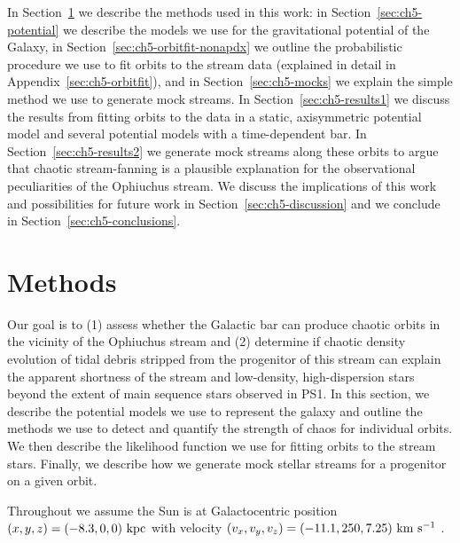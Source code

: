 In Section~\ref{sec:ch5-method} we describe the methods used in this work: in
Section~\ref{sec:ch5-potential} we describe the models we use for the gravitational
potential of the Galaxy, in Section~\ref{sec:ch5-orbitfit-nonapdx} we outline the
probabilistic procedure we use to fit orbits to the stream data (explained in
detail in Appendix~\ref{sec:ch5-orbitfit}), and in Section~\ref{sec:ch5-mocks} we
explain the simple method we use to generate mock streams. In
Section~\ref{sec:ch5-results1} we discuss the results from fitting orbits to the
data in a static, axisymmetric potential model and several potential models with
a time-dependent bar. In Section~\ref{sec:ch5-results2} we generate mock streams
along these orbits to argue that chaotic stream-fanning is a plausible
explanation for the observational peculiarities of the Ophiuchus stream. We
discuss the implications of this work and possibilities for future work in
Section~\ref{sec:ch5-discussion} and we conclude in Section~\ref{sec:ch5-conclusions}.

\section{Methods}\label{sec:ch5-method}

Our goal is to (1) assess whether the Galactic bar can produce chaotic orbits in
the vicinity of the Ophiuchus stream and (2) determine if chaotic density
evolution of tidal debris stripped from the progenitor of this stream can
explain the apparent shortness of the stream and low-density, high-dispersion
stars beyond the extent of main sequence stars observed in PS1. In this section,
we describe the potential models we use to represent the galaxy and outline the
methods we use to detect and quantify the strength of chaos for individual
orbits. We then describe the likelihood function we use for fitting orbits to
the stream stars. Finally, we describe how we generate mock stellar streams for
a progenitor on a given orbit.

Throughout we assume the Sun is at Galactocentric position $(x,y,z) =
(-8.3,0,0)~{\rm kpc}$ \citep[e.g.,][]{schoenrich12} with velocity $(v_x,v_y,v_z)
= (-11.1, 250, 7.25)~\mathrm{km}~\mathrm{s}^{-1}$ \citep[e.g.,][]{schoenrich10, schoenrich12}.

